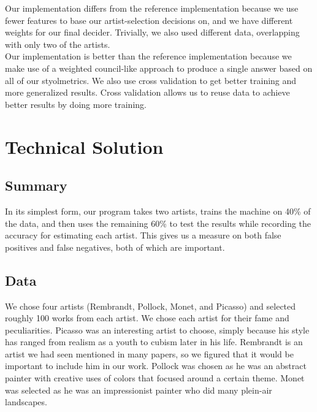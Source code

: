 \documentclass[twocolumn]{article}
\begin{document}
  Our implementation differs from the reference implementation because we use
  fewer features to base our artist-selection decisions on, and we have
  different weights for our final decider. Trivially, we also used different
  data, overlapping with only two of the artists. \\

  Our implementation is better than the reference implementation because we
  make use of a weighted council-like approach to produce a single answer
  based on all of our styolmetrics. We also use cross validation to get better
  training and more generalized results. Cross validation allows us to reuse
  data to achieve better results by doing more training.

  \section{Technical Solution}
  \subsection{Summary}
  In its simplest form, our program takes two artists, trains the machine on
  40\% of the data, and then uses the remaining 60\% to test the results while
  recording the accuracy for estimating each artist. This gives us a measure on
  both false positives and false negatives, both of which are important.

  \subsection{Data}
  We chose four artists (Rembrandt, Pollock, Monet, and Picasso) and selected
  roughly 100 works from each artist. We chose each artist for their fame and
  peculiarities. Picasso was an interesting artist to choose, simply because his
  style has ranged from realism as a youth to cubism later in his life.
  Rembrandt is an artist we had seen mentioned in many papers, so we figured
  that it would be important to include him in our work. Pollock was chosen as
  he was an abstract painter with creative uses of colors that focused around a
  certain theme. Monet was selected as he was an impressionist painter who did
  many plein-air landscapes.
\end{document}
